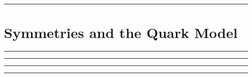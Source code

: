 
\noindent\rule{7in}{2.8pt}
\section{Symmetries and the Quark Model}
    
\begin{problem}{9.1}

\end{problem}
\begin{solution}

\end{solution}

\noindent\rule{7in}{1.5pt}


\begin{problem}{9.2}

\end{problem}
\begin{solution}

\end{solution}

\noindent\rule{7in}{1.5pt}


\begin{problem}{9.3}

\end{problem}
\begin{solution}

\end{solution}

\noindent\rule{7in}{1.5pt}


\begin{problem}{9.4}

\end{problem}
\begin{solution}

\end{solution}

\noindent\rule{7in}{1.5pt}


